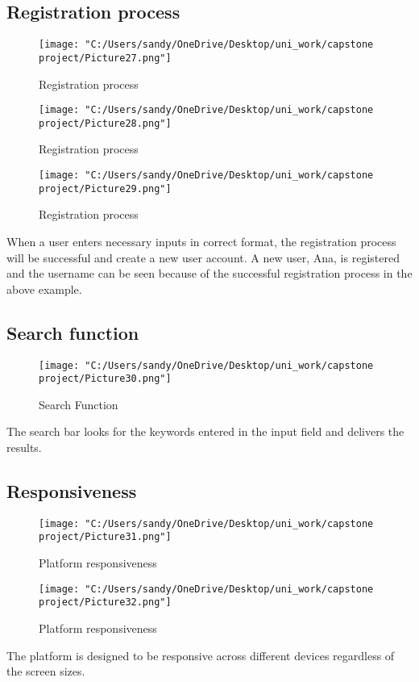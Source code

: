 \documentclass[12pt]{article}
\begin{document}
\subsection{Registration process}
\begin{figure}[H]
	\centering
	\texttt{[image: "C:/Users/sandy/OneDrive/Desktop/uni\_work/capstone project/Picture27.png"]}
	\caption{Registration process}
	
\end{figure}
\begin{figure}[H]
	\centering
	\texttt{[image: "C:/Users/sandy/OneDrive/Desktop/uni\_work/capstone project/Picture28.png"]}
	\caption{Registration process}
	
\end{figure}
\begin{figure}[H]
	\centering
	\texttt{[image: "C:/Users/sandy/OneDrive/Desktop/uni\_work/capstone project/Picture29.png"]}
	\caption{Registration process}
	
\end{figure}
When a user enters necessary inputs in correct format, the registration process will be successful and create a new user account. A new user, Ana, is registered and the username can be seen because of the successful registration process in the above example.
\subsection{Search function}
\begin{figure}[H]
	\centering
	\texttt{[image: "C:/Users/sandy/OneDrive/Desktop/uni\_work/capstone project/Picture30.png"]}
	\caption{Search Function}

\end{figure}
	The search bar looks for the keywords entered in the input field and delivers the results.

\subsection{Responsiveness}
\begin{figure}[H]
	\centering
	\texttt{[image: "C:/Users/sandy/OneDrive/Desktop/uni\_work/capstone project/Picture31.png"]}
	\caption{Platform responsiveness}
	
\end{figure}
\begin{figure}[H]
	\centering
	\texttt{[image: "C:/Users/sandy/OneDrive/Desktop/uni\_work/capstone project/Picture32.png"]}
	\caption{Platform responsiveness}
	
\end{figure}
The platform is designed to be responsive across different devices regardless of the screen sizes.
\end{document}

